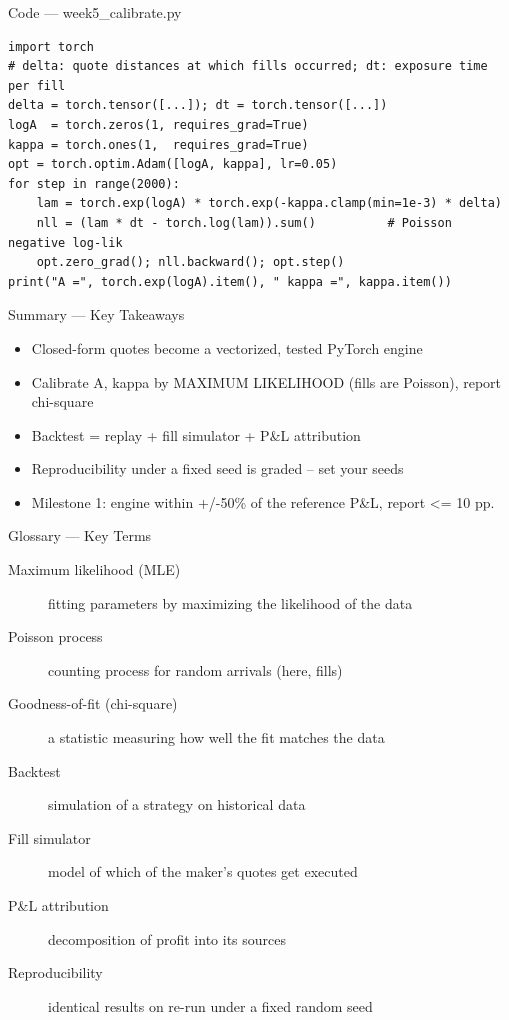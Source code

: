 \documentclass[aspectratio=169,10pt]{beamer}
\begin{document}
\begin{frame}[fragile]{Code --- week5\_calibrate.py}
\begin{lstlisting}
import torch
# delta: quote distances at which fills occurred; dt: exposure time per fill
delta = torch.tensor([...]); dt = torch.tensor([...])
logA  = torch.zeros(1, requires_grad=True)
kappa = torch.ones(1,  requires_grad=True)
opt = torch.optim.Adam([logA, kappa], lr=0.05)
for step in range(2000):
    lam = torch.exp(logA) * torch.exp(-kappa.clamp(min=1e-3) * delta)
    nll = (lam * dt - torch.log(lam)).sum()          # Poisson negative log-lik
    opt.zero_grad(); nll.backward(); opt.step()
print("A =", torch.exp(logA).item(), " kappa =", kappa.item())
\end{lstlisting}
\end{frame}
\begin{frame}{Summary --- Key Takeaways}
\begin{itemize}
  \item Closed-form quotes become a vectorized, tested PyTorch engine
  \item Calibrate A, kappa by MAXIMUM LIKELIHOOD (fills are Poisson), report chi-square
  \item Backtest = replay + fill simulator + P\&L attribution
  \item Reproducibility under a fixed seed is graded -- set your seeds
  \item Milestone 1: engine within +/-50\% of the reference P\&L, report \textless{}= 10 pp.
\end{itemize}
\end{frame}

\begin{frame}{Glossary --- Key Terms}
\footnotesize\begin{description}
\item[\color{ncsured}Maximum likelihood (MLE)] fitting parameters by maximizing the likelihood of the data
\item[\color{ncsured}Poisson process] counting process for random arrivals (here, fills)
\item[\color{ncsured}Goodness-of-fit (chi-square)] a statistic measuring how well the fit matches the data
\item[\color{ncsured}Backtest] simulation of a strategy on historical data
\item[\color{ncsured}Fill simulator] model of which of the maker's quotes get executed
\item[\color{ncsured}P\&L attribution] decomposition of profit into its sources
\item[\color{ncsured}Reproducibility] identical results on re-run under a fixed random seed
\end{description}
\end{frame}
\end{document}
